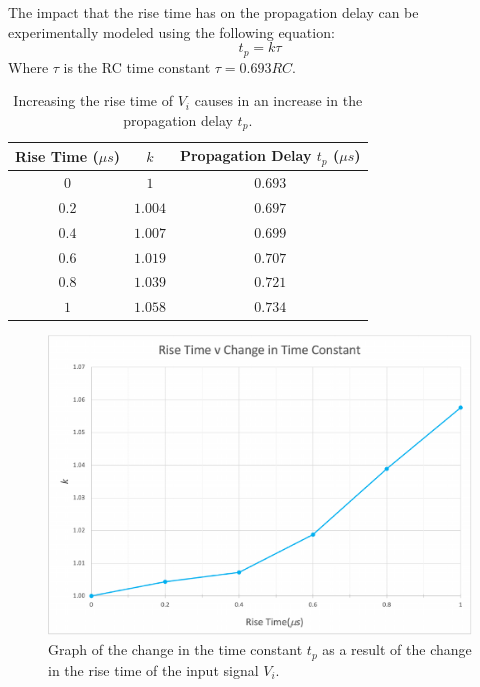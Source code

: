 \documentclass[11pt, a4paper]{article}
\begin{document}
The impact that the rise time has on the propagation delay can be experimentally modeled using the following equation:
\begin{equation}
    t_p = k \tau
\end{equation}
Where $\tau$ is the RC time constant $\tau = 0.693RC$.

\begin{table}[h!]
\centering
\caption{\centering Increasing the rise time of $V_i$ causes in an increase in the propagation delay $t_p$.}
\label{tab:pd}
    \begin{tabular}{c|c|c}
         Rise Time ($\mu s$) & $k$ & Propagation Delay $t_p$ ($\mu s$)\\
         \hline
         $0$ & $1$ & $0.693$ \\
         $0.2$ & $1.004$ & $0.697$ \\
         $0.4$ & $1.007$ & $0.699$ \\
         $0.6$ & $1.019$ & $0.707$ \\
         $0.8$ & $1.039$ & $0.721$ \\
         $1$ & $1.058$ & $0.734$ \\
    \end{tabular}
\end{table}

\begin{figure}[h!]
  \centering
  \includegraphics[width=\textwidth]{report/img/question_4/rise_time_time_constant.pdf}
  \caption{\centering Graph of the change in the time constant $t_p$ as a result of the change in the rise time of the input signal $V_i$.}
    \label{fig:2rt}
\end{figure}
\end{document}
